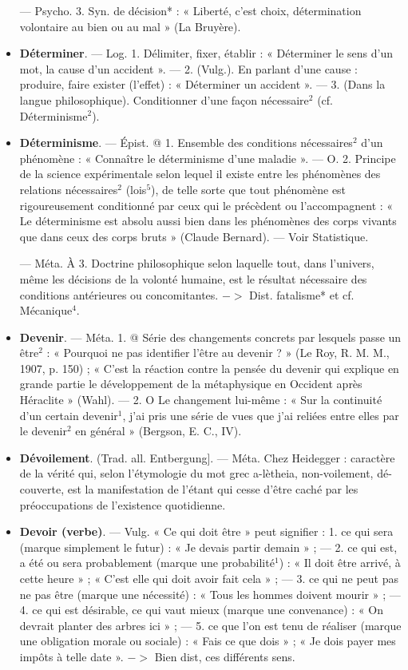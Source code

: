 \begin{itemize}[leftmargin=1cm, label=, itemsep=1pt]
— Psycho. 3. Syn. de décision* :
« Liberté, c'est choix, détermination volontaire au bien ou au mal »
(La Bruyère).

\item {\bf Déterminer}. — Log. 1. Délimiter,
fixer, établir : « Déterminer le sens
d'un mot, la cause d’un accident ».
— 2. (Vulg.). En parlant d’une
cause : produire, faire exister
(l’effet) : « Déterminer un accident ».
— 3. (Dans la langue philosophique). Conditionner d’une façon nécessaire$^2$ (cf. Déterminisme$^2$).

\item {\bf Déterminisme}. — Épist. @ 1. Ensemble des conditions nécessaires$^2$
d’un phénomène : « Connaître le
déterminisme d’une maladie ». —
O. 2. Principe de la science expérimentale selon lequel il existe entre
les phénomènes des relations nécessaires$^2$ (lois$^5$), de telle sorte que tout
phénomène est rigoureusement conditionné par ceux qui le précèdent
ou l’accompagnent : « Le déterminisme est absolu aussi bien dans les
phénomènes des corps vivants que
dans ceux des corps bruts » (Claude
Bernard). — Voir Statistique.

— Méta. À 3. Doctrine philosophique selon laquelle tout, dans
l'univers, même les décisions de la
volonté humaine, est le résultat nécessaire des conditions antérieures
ou concomitantes. $->$ Dist. fatalisme* et cf. Mécanique$^4$.

\item {\bf Devenir}. — Méta. 1. @ Série des changements concrets par lesquels passe
un être$^2$ : « Pourquoi ne pas identifier l’être au devenir ? » (Le Roy,
R. M. M., 1907, p. 150) ; « C’est la
réaction contre la pensée du devenir
qui explique en grande partie le
développement de la métaphysique
en Occident après Héraclite »
(Wahl). — 2. O Le changement lui-même : « Sur la continuité d’un certain devenir$^1$, j'ai pris une série de
vues que j'ai reliées entre elles par
le devenir$^2$ en général » (Bergson,
E. C., IV).

\item {\bf Dévoilement}. (Trad. all. Entbergung].
— Méta. Chez Heidegger : caractère
de la vérité qui, selon l’étymologie
du mot grec a-lètheia, non-voilement, dé-couverte, est la manifestation de l’étant qui cesse d’être
caché par les préoccupations de
l'existence quotidienne.

\item {\bf Devoir (verbe)}. — Vulg. « Ce qui doit
être » peut signifier : 1. ce qui sera
(marque simplement le futur) : « Je
devais partir demain » ; — 2. ce qui
est, a été ou sera probablement
(marque une probabilité$^1$) : « Il doit
être arrivé, à cette heure » ; « C’est
elle qui doit avoir fait cela » ; — 3. ce
qui ne peut pas ne pas être (marque
une nécessité) : « Tous les hommes
doivent mourir » ; — 4. ce qui est
désirable, ce qui vaut mieux (marque
une convenance) : « On devrait
planter des arbres ici » ; — 5. ce que
l’on est tenu de réaliser (marque une
obligation morale ou sociale) : « Fais
ce que dois » ; « Je dois payer mes
impôts à telle date ». $->$ Bien dist,
ces différents sens.


\end{itemize}
